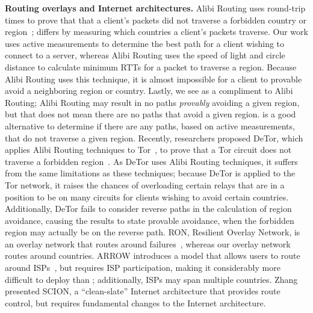 {\bf Routing overlays and Internet architectures.} Alibi Routing uses
round-trip times to prove that that a client's packets did  not traverse a
forbidden country or region~\cite{levin2015alibi,levin_detour}; \system{} differs by
measuring  which countries a client's packets traverse.  Our
work uses active measurements to determine the best path for a client
wishing  to connect to a server, whereas Alibi Routing uses the speed of light and 
circle distance to calculate minimum RTTs for a packet to traverse a region.  Because Alibi Routing 
uses this technique, it is almost impossible for a client to provable avoid a neighboring region or country.  
Lastly, we see \system{} as a compliment to Alibi Routing; Alibi Routing may result in no paths {\it provably} avoiding 
a given region, but that does not mean there are no paths that avoid a given region.  \system{} is a good alternative 
to determine if there are any paths, based on active measurements, that do not traverse a given region.  Recently, 
researchers proposed DeTor, which applies Alibi Routing techniques 
to Tor~\cite{dingledine2004tor}, to prove that a Tor circuit does not traverse a forbidden region~\cite{levin_detour}. 
As DeTor uses Alibi Routing techniques, it suffers from the same limitations as these 
techniques; because DeTor is applied to the Tor network, it raises the chances of overloading 
certain relays that are in a position to be on many circuits for clients wishing to avoid certain 
countries.  Additionally, DeTor fails to consider 
reverse paths in the calculation of region avoidance, causing the results to state provable 
avoidance, when the forbidden region may actually be on the reverse path. RON, Resilient Overlay Network, is an
overlay network that  routes around failures~\cite{andersen2001resilient}, whereas our overlay network
routes around countries.  ARROW introduces a
model that allows users to route around ISPs~\cite{peter2015one}, but requires
ISP participation, making it considerably more difficult to deploy than
\system{}; additionally, ISPs may span multiple countries. %
Zhang \ea{} presented SCION, a ``clean-slate'' Internet architecture that
provides route control, but requires fundamental
changes to the Internet architecture. %

